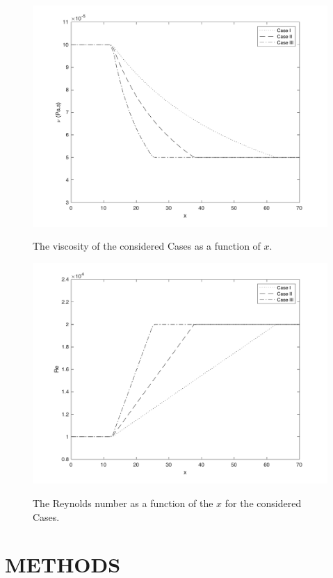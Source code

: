 \documentclass[twocolumn,10pt]{asme2e}
\begin{document}
\begin{figure}[!htbp]
	\centering
	\scalebox{0.5}
	{\includegraphics{viscosity.pdf}}
	\caption{The viscosity of the considered Cases as a function of \(x\).}
	\label{fig:viscosity}
	\end{figure}

\begin{figure}[!htbp]
	\centering
	\scalebox{0.5}
	{\includegraphics{reynolds.pdf}}
	\caption{The Reynolds number as a function of the \(x\) for the considered Cases.}
	\label{fig:reynolds}
\end{figure}

\section*{METHODS}
\end{document}
